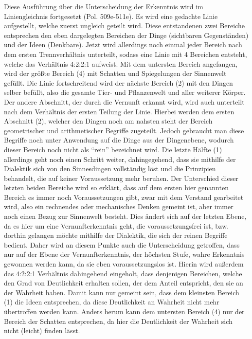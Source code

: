 Diese Ausführung über die Unterscheidung der Erkenntnis wird im Liniengleichnis fortgesetzt (Pol. 509e-511e).
Es wird eine gedachte Linie aufgestellt, welche zuerst ungleich geteilt wird. Diese entstandenen zwei Bereiche entsprechen den eben dargelegten Bereichen der Dinge (sichtbaren Gegenständen) und der Ideen (Denkbare). Jetzt wird allerdings noch einmal jeder Bereich nach dem ersten Trennverhältnis unterteilt, sodass eine Linie mit 4 Bereichen entsteht, welche das Verhältnis 4:2:2:1 aufweist. Mit dem untersten Bereich angefangen, wird der größte Bereich (4) mit Schatten und Spiegelungen der Sinnenwelt gefüllt. Die Linie fortschreitend wird der nächste Bereich (2) mit den Dingen selber befüllt, also die gesamte Tier- und Pflanzenwelt und aller weiterer Körper. Der andere Abschnitt, der durch die Vernunft erkannt wird, wird auch unterteilt nach dem Verhältnis der ersten Teilung der Linie. Hierbei werden dem ersten Abschnitt (2), welcher den Dingen noch am nahsten steht der Bereich geometrischer und arithmetischer Begriffe zugeteilt. Jedoch gebraucht man diese Begriffe noch unter Anwendung auf die Dinge aus der Dingenebene, wodurch dieser Bereich noch nicht als \enquote{rein} bezeichnet wird. Die letzte Hälfte (1) allerdings geht noch einen Schritt weiter, dahingegehend, dass sie mithilfe der Dialektik sich von den Sinnesdingen vollständig löst und die Prinzipien behandelt, die auf keiner Voraussetzung mehr beruhen. Der Unterschied dieser letzten beiden Bereiche wird so erklärt, dass auf dem ersten hier genannten Bereich es immer noch Voraussetzungen gibt, zwar mit dem Verstand gearbeitet wird, also ein rechnendes oder mechanisches Denken gemeint ist, aber immer noch einen Bezug zur Sinnenwelt besteht. Dies ändert sich auf der letzten Ebene, da es hier um eine Vernunfterkenntnis geht, die voraussetzungsfrei ist, bzw. dorthin gelangen möchte mithilfe der Dialektik, die sich der reinen Begriffe bedient. 
Daher wird an diesem Punkte auch die Unterscheidung getroffen, dass nur auf der Ebene der Vernunfterkenntnis, der höchsten Stufe, wahre Erkenntnis gewonnen werden kann, da sie eben voraussetzungslos ist. Hierin wird außerdem das 4:2:2:1 Verhältnis dahingehend eingeholt, dass denjenigen Bereichen, welche den Grad von Deutlichkeit erhalten sollen, der dem Anteil entspricht, den sie an der Wahrheit haben. Damit kann nur gemeint sein, dass dem kleinsten Bereich (1) die Ideen entsprechen, da diese Deutlichkeit an Wahrheit nicht mehr übertroffen werden kann. Anders herum kann dem untersten Bereich (4) nur der Bereich der Schatten entsprechen, da hier die Deutlichkeit der Wahrheit sich nicht (leicht) finden lässt.
